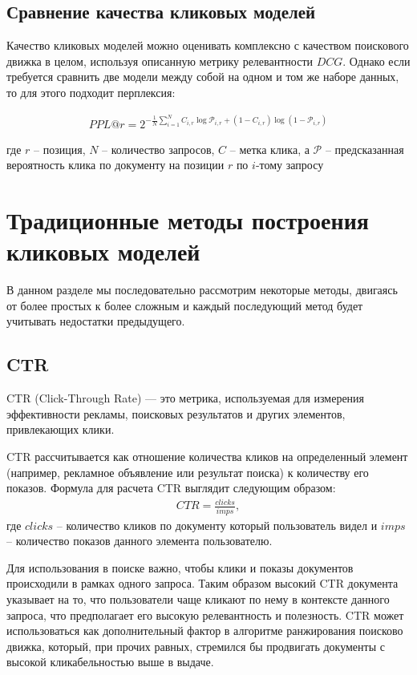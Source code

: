 \documentclass[diploma]{nanolab2015}
\begin{document}
\subsection{Сравнение качества кликовых моделей}
Качество кликовых моделей можно оценивать комплексно с качеством поискового движка в целом, используя описанную метрику релевантности $DCG$. Однако если требуется сравнить две модели между собой на одном и том же наборе данных, то для этого подходит перплексия:

\begin{align}
    PPL@r = 2^{-\frac{1}{N}\sum_{i=1}^{N}C_{i,r}\log\mathcal{P}_{i,r} + (1 - C_{i,r})\log(1 - \mathcal{P}_{i,r}) }
\end{align}

где $r$ -- позиция, $N$ -- количество запросов, $C$ -- метка клика, а $\mathcal{P}$ -- предсказанная вероятность клика по документу на позиции $r$ по $i$-тому запросу

\section{Традиционные методы построения кликовых моделей}
В данном разделе мы последовательно рассмотрим некоторые методы, двигаясь от более простых к более сложным и каждый последующий метод будет учитывать недостатки предыдущего.
\subsection{CTR}
CTR (Click-Through Rate) — это метрика, используемая для измерения эффективности рекламы, поисковых результатов и других элементов, привлекающих клики. %

CTR рассчитывается как отношение количества кликов на определенный элемент (например, рекламное объявление или результат поиска) к количеству его показов. Формула для расчета CTR выглядит следующим образом:
\begin{align}
    CTR = \frac{clicks}{imps},
\end{align}
где $clicks$ -- количество кликов по документу который пользователь видел и $imps$ -- количество показов данного элемента пользователю.

Для использования в поиске важно, чтобы клики и показы документов происходили в рамках одного запроса. Таким образом высокий CTR документа указывает на то, что пользователи чаще кликают по нему в контексте данного запроса, что предполагает его высокую релевантность и полезность. CTR может использоваться как дополнительный фактор в алгоритме ранжирования поисково движка, который, при прочих равных, стремился бы продвигать документы с высокой кликабельностью выше в выдаче.
\end{document}
